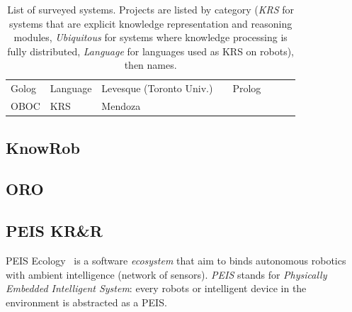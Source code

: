 \documentclass[a4paper, twocolumn]{article}
\begin{document}
\begin{landscape}
\begin{table}
\begin{center}
\begin{tabular}{p{2.2cm}p{1.6cm}p{4cm}lp{2.4cm}p{3.4cm}p{2.8cm}p{1.5cm}}
Golog & Language & Levesque (Toronto Univ.) & & {\sc Prolog} & & & \\
OBOC & KRS & Mendoza & & & & & \cite{Mendoza2005} \\

\bottomrule

\end{tabular}
\end{center}

\caption{List of surveyed systems. Projects are listed by category (\emph{KRS}
for systems that are explicit knowledge representation and reasoning modules,
\emph{Ubiquitous} for systems where knowledge processing is fully distributed,
\emph{Language} for languages used as KRS on robots), then names.}

\label{table|surveyed-systems}
\end{table}
\end{landscape}


\subsection{KnowRob}
\label{sect|knowrob}

\subsection{ORO}
\label{sect|oro}

\subsection{PEIS KR\&R}
\label{sect|peis-ecology}


{\sc PEIS Ecology}~\cite{Saffiotti2005} is a software \emph{ecosystem} that aim to binds autonomous
robotics with ambient intelligence (network of sensors). \emph{PEIS} stands for
\emph{Physically Embedded Intelligent System}: every robots or intelligent
device in the environment is abstracted as a PEIS.
\end{document}
